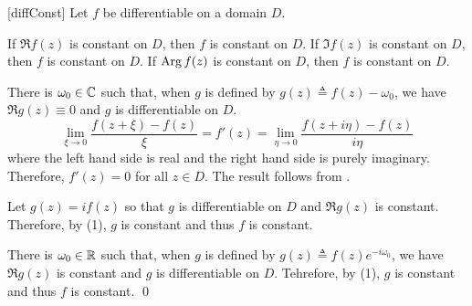 \documentclass[../complex_variables_1.tex]{subfiles}
\begin{document}
\begin{Corollary}{}[diffConst]
    Let \(f\) be differentiable on a domain \(D\).
    \begin{enumerate}[label=(\arabic*), ref=\protect{\Cref{th:diffConst} (\arabic*)}]
        \ii\label{itm:diffConst.1}
        If \(\Re f(z)\) is constant on \(D\), then \(f\) is constant on \(D\).
        \ii\label{itm:diffConst.2}
        If \(\Im f(z)\) is constant on \(D\), then \(f\) is constant on \(D\).
        \ii\label{itm:diffConst.3}
        If \(\operatorname{Arg} f(z)\) is constant on \(D\), then \(f\) is constant on \(D\).
    \end{enumerate}
\end{Corollary}
\begin{myclaim}[Proof]\hfill
\begin{enumerate}[label=(\arabic*)]
    \ii
    There is \(\omega_0 \in \CC\) such that, when \(g\) is defined by \(g(z) \triangleq f(z) -
    \omega_0\), we have \(\Re g(z) \equiv 0\) and \(g\) is differentiable on \(D\).
    \[
        \lim_{\xi \to 0} \frac{f(z + \xi) - f(z)}{\xi} = f'(z)
        = \lim_{\eta \to 0} \frac{f(z + i\eta) - f(z)}{i\eta}
    \]
    where the left hand side is real and the right hand side is purely imaginary.
    Therefore, \(f'(z) = 0\) for all \(z \in D\).
    The result follows from .

    \ii
    Let \(g(z) = if(z)\) so that \(g\) is differentiable on \(D\) and \(\Re g(z)\) is constant.
    Therefore, by (1), \(g\) is constant and thus \(f\) is constant.

    \ii
    There is \(\omega_0 \in \RR\) such that, when \(g\) is defined by \(g(z) \triangleq f(z)e^{-i\omega_0}\),
    we have \(\Re g(z)\) is constant and \(g\) is differentiable on \(D\).
    Tehrefore, by (1), \(g\) is constant and thus \(f\) is constant.
    \qed
\end{enumerate}
\end{myclaim}
\end{document}
